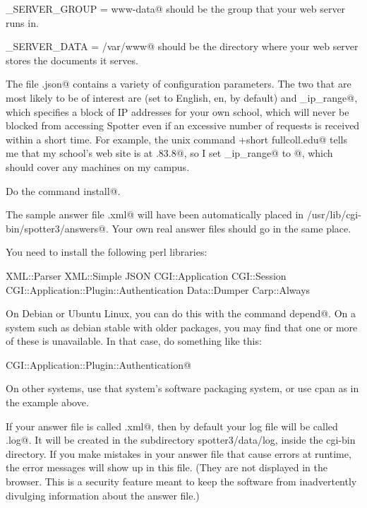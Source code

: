 \documentclass{doc}
\begin{document}
\verb@WEB_SERVER_GROUP = www-data@ should be the group that your web server runs in.

\verb@WEB_SERVER_DATA = /var/www@ should be the directory where your web server stores the documents it serves.

The file \verb@config.json@ contains a variety of configuration parameters. The two that are most
likely to be of interest are \verb@language@ (set to English, en, by default) and
\verb@immune_ip_range@, which specifies a block of IP addresses for your own school,
which will never be blocked from accessing Spotter even if an excessive number of
requests is received within a short time. For example, the unix command
\verb@dig +short fullcoll.edu@ tells me that my school's web site is
at .83.8@, so I set \verb@immune_ip_range@ to @,
which should cover any machines on my campus.

Do the command \verb@make install@.

The sample answer file \verb@sample.xml@ will have been automatically placed in
\verb@/usr/lib/cgi-bin/spotter3/answers@. Your own real answer files should go in the same
place.

You need to install the following perl libraries:

XML::Parser XML::Simple JSON CGI::Application CGI::Session
CGI::Application::Plugin::Authentication Data::Dumper Carp::Always

On Debian or Ubuntu Linux, you can do this with the command \verb@make depend@.
On a system such as debian stable with older packages, you may find that one or more of these is
unavailable. In that case, do something like this:

\verb@cpan CGI::Application::Plugin::Authentication@

On other systems, use that system's software packaging system, or use cpan as
in the example above.


If your answer file is called \verb@spotter.xml@, then by default your log file will be
called \verb@spotter.log@. It will be created in the subdirectory spotter3/data/log, inside the
cgi-bin directory.
If you make mistakes in your answer file that cause errors at runtime, the error
messages will show up in this file. (They are not displayed in the browser. This
is a security feature meant to keep the software from inadvertently divulging
information about the answer file.)
\end{document}
